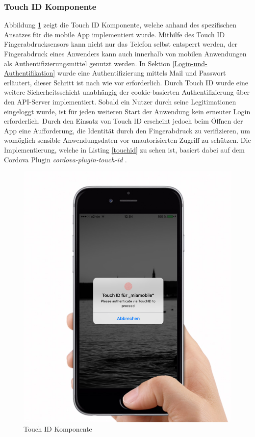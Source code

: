 \subsubsection{Touch ID Komponente}

Abbildung \ref{touchidmock} zeigt die Touch ID Komponente, welche anhand des spezifischen Ansatzes für die mobile App implementiert wurde.
Mithilfe des Touch ID Fingerabdrucksensors kann nicht nur das Telefon selbst entsperrt werden,
der Fingerabdruck eines Anwenders kann auch innerhalb von mobilen Anwendungen als Authentifizierungsmittel genutzt werden.
In Sektion \ref{Login-und-Authentifikation} wurde eine Authentifizierung mittels Mail und Passwort erläutert,
dieser Schritt ist nach wie vor erforderlich. Durch Touch ID wurde eine weitere Sicherheitsschicht unabhängig der cookie-basierten Authentifizierung über den API-Server implementiert.
Sobald ein Nutzer durch seine Legitimationen eingeloggt wurde, ist für jeden weiteren Start der Anwendung kein erneuter Login erforderlich.
Durch den Einsatz von Touch ID erscheint jedoch beim Öffnen der App eine Aufforderung, die Identität durch den Fingerabdruck zu verifizieren, um womöglich sensible Anwendungsdaten vor unautorisierten Zugriff zu schützen.
Die Implementierung, welche in Listing \ref{touchid} zu sehen ist, basiert dabei auf dem Cordova Plugin \emph{cordova-plugin-touch-id} \cite{EddyV87:online}.

\vspace{0.3cm}
\begin{figure}[h!]
 \centering
 \includegraphics[width=0.5\linewidth]{kapitel4/touchid-mock.jpg}
 \caption{Touch ID Komponente}
 \label{touchidmock}
\end{figure}

